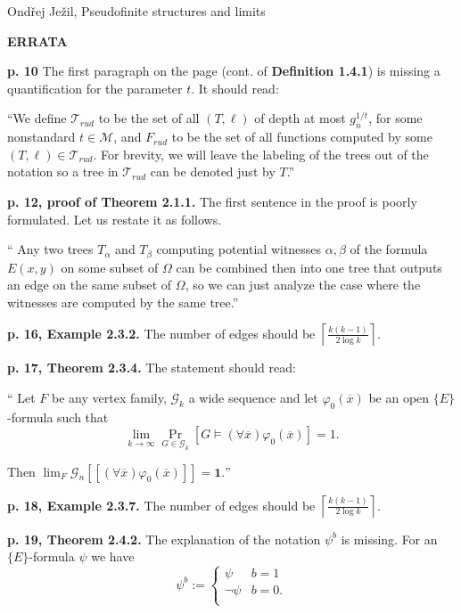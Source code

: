 \documentclass{article}
\def\llbracket{[\![}
\def\rrbracket{]\!]}
\newcommand{\bbl}{\llbracket}
\newcommand{\bbr}{\rrbracket}
\newcommand{\1}{\textbf{1}}
\newcommand{\0}{\textbf{0}}
\newcommand{\ceil}[1]{\left \lceil {#1} \right \rceil}
\newcommand{\M}{\mathcal{M}}
\newcommand{\G}{\mathcal{G}}
\newcommand{\T}{\mathcal{T}}
\begin{document}
\begin{center}
Ondřej Ježil, Pseudofinite structures and limits

\normalsize
\textbf{ERRATA}
\end{center}

\textbf{p. 10} The first paragraph on the page (cont. of \textbf{Definition 1.4.1}) is missing a quantification for the parameter $t$. It should read: 

``We define $\T_{rud}$ to be the set of all $(T,\ell)$ of depth at most $g_n^{1/t}$, for some nonstandard $t\in\M$, and $F_{rud}$ to be the set of all functions computed by some $(T,\ell)\in \T_{rud}$. For brevity, we will leave the labeling of the trees out of the notation so a tree in $\T_{rud}$ can be denoted just by $T$.''

\vspace{0.5em}
\textbf{p. 12, proof of Theorem 2.1.1.} The first sentence in the proof is poorly formulated. Let us restate it as follows.

``
Any two trees $T_\alpha$ and $T_\beta$ computing potential witnesses $\alpha,\beta$ of the formula $E(x,y)$ on some subset of $\Omega$ can be combined then into one tree that outputs an edge on the same subset of $\Omega$, so we can just analyze the case where the witnesses are computed by the same tree.''

\vspace{0.5em}
\textbf{p. 16, Example 2.3.2.} 
The number of edges should be $\ceil{\frac{k(k-1)}{2\log k}}$.


\vspace{0.5em}
\textbf{p. 17, Theorem 2.3.4.} The statement should read:

``
Let $F$ be any vertex family, $\G_k$ a wide sequence and let $\varphi_0(\overline x)$ be an open $\{E\}$-formula such that
\[\lim_{k\to\infty}\Pr_{G\in\mathcal{G}_k}[G\models(\forall \overline x)\varphi_0(\overline x)]=1.\]

Then $\lim_F \G_n \bbl(\forall \overline x)\varphi_0(\overline x)\bbr=\1.$''

\vspace{0.5em}
\textbf{p. 18, Example 2.3.7.} 
The number of edges should be $\ceil{\frac{k(k-1)}{2\log k}}$.

\vspace{0.5em}
\textbf{p. 19, Theorem 2.4.2.} The explanation of the notation $\psi^b$ is missing. For an $\{E\}$-formula $\psi$ we have
\[\psi^b:=
\begin{cases}
\psi & b=1\\
\lnot \psi & b=0.\\
\end{cases}
\]
\end{document}
